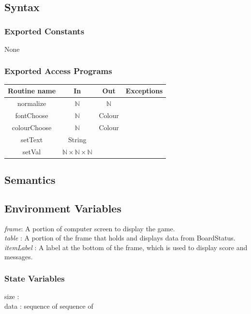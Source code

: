 \documentclass{article}
\begin{document}
\subsection*{Syntax}
\subsubsection*{Exported Constants}
None
\subsubsection*{Exported Access Programs}
\begin{tabular}{ | c | c | c | c | }
        \hline 
    
          \textbf{Routine name} & \textbf{In} & \textbf{Out} & \textbf{Exceptions}\\
          \hline 
          normalize &$\mathbb{N}$ & $\mathbb{N}$ & \\\hline
          fontChoose & $\mathbb{N}$ & Colour & \\ \hline
          colourChoose & $\mathbb{N}$ & Colour & \\ \hline
          setText & String &  & \\ \hline
          setVal & $\mathbb{N} \times \mathbb{N} \times \mathbb{N}$&  & \\ \hline
          
          
         
\end{tabular}
\subsection*{Semantics}
\subsection*{Environment Variables}
\textit{frame}: A portion of computer screen to display the game. \\
\textit{table} : A portion of the frame that holds and displays data from BoardStatus. \\
\textit{itemLabel} : A label at the bottom of the frame, which is used to display score and messages. \\



\subsubsection*{State Variables}
size :  \\
data : sequence of sequence of 
\end{document}
